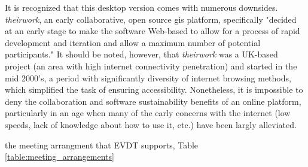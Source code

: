 It is recognized that this desktop version comes with numerous downsides. \textit{theirwork}, an early collaborative, open source \ac{gis} platform, specifically "decided at an early stage to make the software Web-based to allow for a process of rapid development and iteration and allow a maximum number of potential participants." \cite{williamsonTheirworkDevelopmentSustainable2011} It should be noted, however, that \textit{theirwork} was a UK-based project (an area with high internet connectivity penetration) and started in the mid 2000's, a period with significantly diversity of internet browsing methods, which simplified the task of ensuring accessibility. Nonetheless, it is impossible to deny the collaboration and software sustainability benefits of an online platform, particularly in an age when many of the early concerns with the internet (low speeds, lack of knowledge about how to use it, etc.) \cite{shifterInteractiveMultimediaPlanning1995} have been largly alleviated.

the meeting arrangment that EVDT supports, Table \ref{table:meeting_arrangements}

